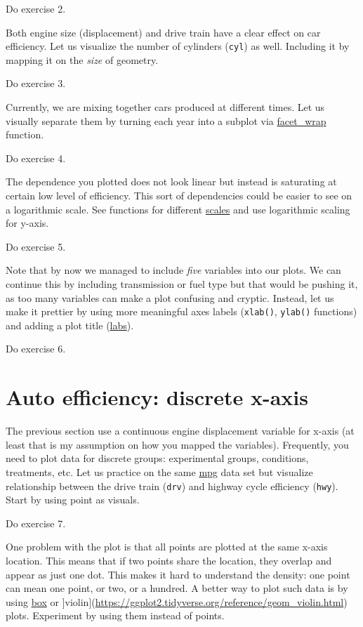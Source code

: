 \documentclass[
]{book}
\begin{document}
Do exercise 2.

Both engine size (displacement) and drive train have a clear effect on car efficiency. Let us visualize the number of cylinders (\texttt{cyl}) as well. Including it by mapping it on the \emph{size} of geometry.

Do exercise 3.

Currently, we are mixing together cars produced at different times. Let us visually separate them by turning each year into a subplot via \href{https://ggplot2.tidyverse.org/reference/facet_wrap.html}{facet\_wrap} function.

Do exercise 4.

The dependence you plotted does not look linear but instead is saturating at certain low level of efficiency. This sort of dependencies could be easier to see on a logarithmic scale. See functions for different \href{https://ggplot2.tidyverse.org/reference/scale_continuous.html}{scales} and use logarithmic scaling for y-axis.

Do exercise 5.

Note that by now we managed to include \emph{five} variables into our plots. We can continue this by including transmission or fuel type but that would be pushing it, as too many variables can make a plot confusing and cryptic. Instead, let us make it prettier by using more meaningful axes labels (\texttt{xlab()}, \texttt{ylab()} functions) and adding a plot title (\href{https://ggplot2.tidyverse.org/reference/labs.html}{labs}).

Do exercise 6.

\hypertarget{auto-efficiency-discrete-x-axis}{%
\section{Auto efficiency: discrete x-axis}\label{auto-efficiency-discrete-x-axis}}

The previous section use a continuous engine displacement variable for x-axis (at least that is my assumption on how you mapped the variables). Frequently, you need to plot data for discrete groups: experimental groups, conditions, treatments, etc. Let us practice on the same \href{https://ggplot2.tidyverse.org/reference/mpg.html}{mpg} data set but visualize relationship between the drive train (\texttt{drv}) and highway cycle efficiency (\texttt{hwy}). Start by using point as visuals.

Do exercise 7.

One problem with the plot is that all points are plotted at the same x-axis location. This means that if two points share the location, they overlap and appear as just one dot. This makes it hard to understand the density: one point can mean one point, or two, or a hundred. A better way to plot such data is by using \href{https://ggplot2.tidyverse.org/reference/geom_boxplot.html}{box} or {]}violin{]}(\url{https://ggplot2.tidyverse.org/reference/geom_violin.html}) plots. Experiment by using them instead of points.
\end{document}
